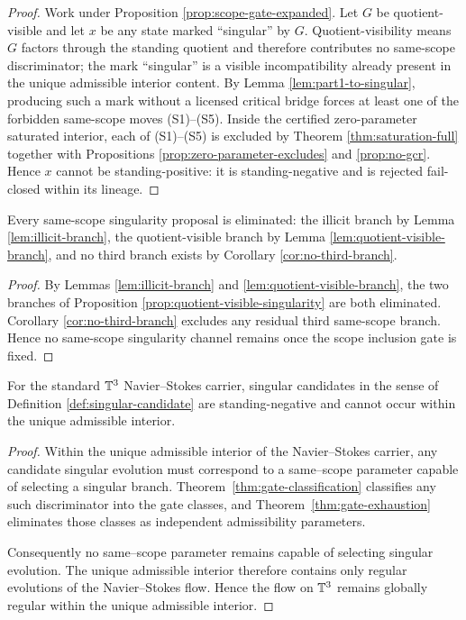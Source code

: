 \begin{proof}
Work under Proposition \ref{prop:scope-gate-expanded}. Let $G$ be quotient-visible and let $x$ be any
state marked ``singular'' by $G$. Quotient-visibility means $G$ factors through the standing
quotient and therefore contributes no same-scope discriminator; the mark ``singular'' is a
visible incompatibility already present in the unique admissible interior content. By Lemma
\ref{lem:part1-to-singular}, producing such a mark without a licensed critical bridge forces at least
one of the forbidden same-scope moves (S1)--(S5). Inside the certified zero-parameter saturated
interior, each of (S1)--(S5) is excluded by Theorem \ref{thm:saturation-full} together with
Propositions \ref{prop:zero-parameter-excludes} and \ref{prop:no-gcr}. Hence $x$ cannot be
standing-positive: it is standing-negative and is rejected fail-closed within its lineage.

\end{proof}

\begin{proposition}\label{prop:exhaustive-branch-elimination}
Every same-scope singularity proposal is
eliminated: the illicit branch by Lemma \ref{lem:illicit-branch}, the quotient-visible branch by Lemma
\ref{lem:quotient-visible-branch}, and no third branch exists by Corollary \ref{cor:no-third-branch}.
\end{proposition}

\begin{proof}
By Lemmas \ref{lem:illicit-branch} and \ref{lem:quotient-visible-branch}, the two branches of
Proposition \ref{prop:quotient-visible-singularity} are both eliminated. Corollary
\ref{cor:no-third-branch} excludes any residual third same-scope branch. Hence no same-scope
singularity channel remains once the scope inclusion gate is fixed.
\end{proof}


\begin{theorem}\label{thm:structural-closure}
For the standard $\mathbb{T}^3$ Navier--Stokes carrier, singular candidates in the sense of Definition \ref{def:singular-candidate} are standing-negative
and cannot occur within the unique admissible interior.
\end{theorem}

\begin{proof}
Within the unique admissible interior of the Navier--Stokes carrier, any candidate singular evolution must correspond
to a same--scope parameter capable of selecting a singular branch. Theorem~\ref{thm:gate-classification} classifies any such discriminator into the gate classes, and Theorem~\ref{thm:gate-exhaustion} eliminates those classes as independent admissibility parameters.

Consequently no same--scope parameter remains capable of selecting singular evolution. The unique admissible interior
therefore contains only regular evolutions of the Navier--Stokes flow. Hence the flow on $\mathbb{T}^3$ remains globally
regular within the unique admissible interior.
\end{proof}




